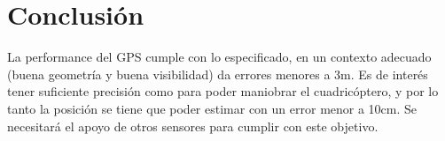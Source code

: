 \documentclass[spanish,12pt,a4paper,titlepage]{report}
\begin{document}

\newpage
\section{Conclusión}
\label{sec:conclusion}

La performance del GPS cumple con lo especificado, en un contexto adecuado (buena geometría y buena visibilidad) da errores menores a 3m. Es de interés tener suficiente precisión como para poder maniobrar el cuadricóptero, y por lo tanto la posición se tiene que poder estimar con un error menor a 10cm. Se necesitará el apoyo de otros sensores para cumplir con este objetivo.
\end{document}

